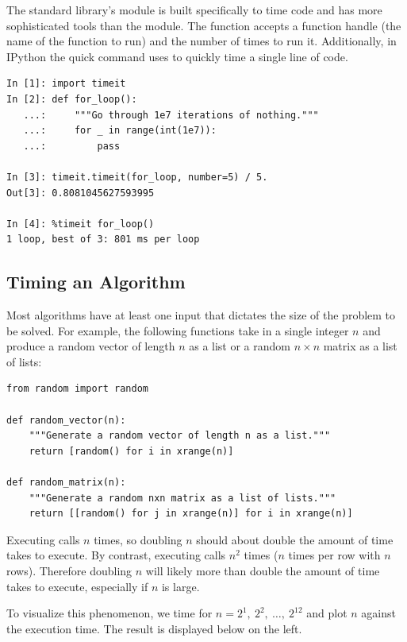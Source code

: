 The standard library's  module is built specifically to time code and has more sophisticated tools than the  module.
The  function accepts a function handle (the name of the function to run) and the number of times to run it.
Additionally, in IPython the quick command  uses  to quickly time a single line of code.

\begin{lstlisting}
In [1]: import timeit
In [2]: def for_loop():
   ...:     """Go through 1e7 iterations of nothing."""
   ...:     for _ in range(int(1e7)):
   ...:         pass

In [3]: timeit.timeit(for_loop, number=5) / 5.
Out[3]: 0.8081045627593995

In [4]: %timeit for_loop()
1 loop, best of 3: 801 ms per loop
\end{lstlisting}

\subsection*{Timing an Algorithm} %

Most algorithms have at least one input that dictates the size of the problem to be solved.
For example, the following functions take in a single integer $n$ and produce a random vector of length $n$ as a list or a random $n\times n$ matrix as a list of lists:

\begin{lstlisting}
from random import random

def random_vector(n):
    """Generate a random vector of length n as a list."""
    return [random() for i in xrange(n)]

def random_matrix(n):
    """Generate a random nxn matrix as a list of lists."""
    return [[random() for j in xrange(n)] for i in xrange(n)]
\end{lstlisting}

Executing  calls  $n$ times, so doubling $n$ should about double the amount of time  takes to execute.
By contrast, executing  calls  $n^2$ times ($n$ times per row with $n$ rows).
Therefore doubling $n$ will likely more than double the amount of time  takes to execute, especially if $n$ is large.

To visualize this phenomenon, we time  for $n = 2^1,\ 2^2,\ \ldots,\ 2^{12}$ and plot $n$ against the execution time.
The result is displayed below on the left.%

